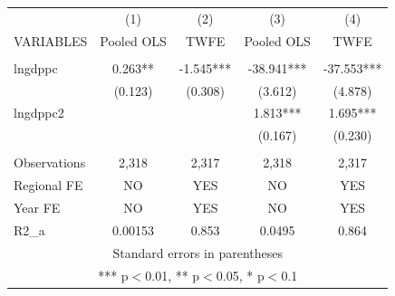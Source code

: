 \documentclass[]{article}
\begin{document}
\begin{tabular}{lcccc} \hline
 & (1) & (2) & (3) & (4) \\
VARIABLES & Pooled OLS & TWFE & Pooled OLS & TWFE \\ \hline
 &  &  &  &  \\
lngdppc & 0.263** & -1.545*** & -38.941*** & -37.553*** \\
 & (0.123) & (0.308) & (3.612) & (4.878) \\
lngdppc2 &  &  & 1.813*** & 1.695*** \\
 &  &  & (0.167) & (0.230) \\
 &  &  &  &  \\
Observations & 2,318 & 2,317 & 2,318 & 2,317 \\
Regional FE & NO & YES & NO & YES \\
Year FE & NO & YES & NO & YES \\
 R2\_a & 0.00153 & 0.853 & 0.0495 & 0.864 \\ \hline
\multicolumn{5}{c}{ Standard errors in parentheses} \\
\multicolumn{5}{c}{ *** p$<$0.01, ** p$<$0.05, * p$<$0.1} \\
\end{tabular}
\end{document}
